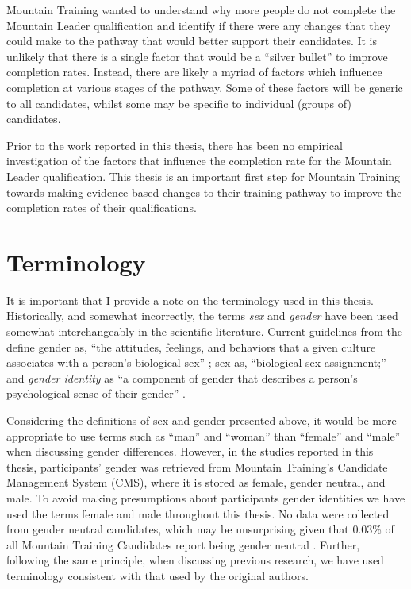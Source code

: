 \documentclass[
  12pt,
  a4paper,
]{book}
\begin{document}
Mountain Training wanted to understand why more people do not complete the Mountain Leader qualification and identify if there were any changes that they could make to the pathway that would better support their candidates. It is unlikely that there is a single factor that would be a ``silver bullet'' to improve completion rates. Instead, there are likely a myriad of factors which influence completion at various stages of the pathway. Some of these factors will be generic to all candidates, whilst some may be specific to individual (groups of) candidates.

Prior to the work reported in this thesis, there has been no empirical investigation of the factors that influence the completion rate for the Mountain Leader qualification. This thesis is an important first step for Mountain Training towards making evidence-based changes to their training pathway to improve the completion rates of their qualifications.

\hypertarget{terminology}{%
\section{Terminology}\label{terminology}}

It is important that I provide a note on the terminology used in this thesis. Historically, and somewhat incorrectly, the terms \emph{sex} and \emph{gender} have been used somewhat interchangeably in the scientific literature. Current guidelines from the \citet{APA2020} define gender as, ``the attitudes, feelings, and behaviors that a given culture associates with a person's biological sex'' \citep[p 12]{APA2012}; sex as, ``biological sex assignment;'' and \textit{gender identity} as ``a component of gender that describes a person's psychological sense of their gender'' \citep[Section 5.5]{APA2020}.

Considering the definitions of sex and gender presented above, it would be more appropriate to use terms such as ``man'' and ``woman'' than ``female'' and ``male'' when discussing gender differences. However, in the studies reported in this thesis, participants' gender was retrieved from Mountain Training's Candidate Management System (CMS), where it is stored as female, gender neutral, and male. To avoid making presumptions about participants gender identities we have used the terms female and male throughout this thesis. No data were collected from gender neutral candidates, which may be unsurprising given that 0.03\% of all Mountain Training Candidates report being gender neutral \citep{MountainTrainingUK2019a}. Further, following the same principle, when discussing previous research, we have used terminology consistent with that used by the original authors.
\end{document}
